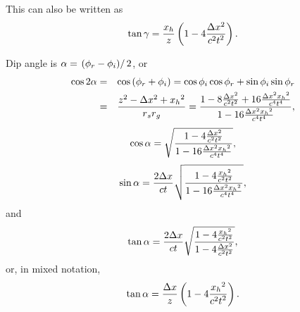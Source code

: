 This can also be written as
\begin{equation}\tan  \gamma =\frac{\text{\textit{$ x_h$}}}{\text{\textit{$z$}}}\left(1-4\frac{\Delta \text{\textit{$x$}}^2\text{\textit{$ $}}}{\text{\textit{$c$}}^2\text{\textit{$
$}}\text{\textit{$t$}}^2}\right).\end{equation}

Dip angle is \(\alpha =\left.\left(\phi _r-\phi _i\right)\right/2\), or
\begin{eqnarray}\cos  2\alpha &=&\cos  \left(\phi _{\text{\textit{$r$}}}+\phi _{\text{\textit{$i$}}}\right)=\cos  \phi _{\text{\textit{$i$}}}\cos
\phi _{\text{\textit{$r$}}}+\sin  \phi _{\text{\textit{$i$}}} \sin  \phi _{\text{\textit{$r$}}}\nonumber\\
&=&\frac{\text{\textit{$z$}}^2\text{\textit{$ $}}-\Delta \text{\textit{$x$}}^2+\text{\textit{$x_h$}}{}^2}{\text{\textit{$r$}}_{\text{\textit{$s$}}}\text{\textit{$r$}}_{\text{\textit{$g$}}}}=\frac{1-8
\frac{\text{\textit{$ $}}\Delta \text{\textit{$x$}}^2}{\text{\textit{$c$}}^2\text{\textit{$ $}}\text{\textit{$t$}}^2}+16\frac{\Delta \text{\textit{$x$}}^2\text{\textit{$
$}}\text{\textit{$x_h$}}{}^2}{\text{\textit{$c$}}^4\text{\textit{$ $}}\text{\textit{$t$}}^4}}{1-16\frac{\Delta \text{\textit{$x$}}^2\text{\textit{$
$}}\text{\textit{$x_h$}}{}^2}{\text{\textit{$c$}}^4\text{\textit{$ $}}\text{\textit{$t$}}^4}},
\end{eqnarray}
\begin{equation}\cos  \alpha =\sqrt{\frac{1 -4 \frac{\text{\textit{$ $}}\Delta \text{\textit{$x$}}^2}{\text{\textit{$c$}}^2\text{\textit{$ $}}\text{\textit{$t$}}^2}}{1-16\frac{\Delta
\text{\textit{$x$}}^2\text{\textit{$ $}}\text{\textit{$x_h$}}{}^2}{\text{\textit{$c$}}^4\text{\textit{$ $}}\text{\textit{$t$}}^4}}},\end{equation}
\begin{equation}\sin  \alpha =\frac{2\text{\textit{$ $}}\Delta \text{\textit{$x$}}}{\text{\textit{$c t$}}}\sqrt{\frac{1-4\frac{\text{\textit{$x_h$}}{}^2\text{\textit{$
$}}}{\text{\textit{$c$}}^2\text{\textit{$ $}}\text{\textit{$t$}}^2} }{1-16\frac{\Delta \text{\textit{$x$}}^2\text{\textit{$ $}}\text{\textit{$x_h$}}{}^2}{\text{\textit{$c$}}^4\text{\textit{$
$}}\text{\textit{$t$}}^4}}},\end{equation}
and
\begin{equation}\tan  \alpha =\frac{2\text{\textit{$ $}}\Delta \text{\textit{$x$}}}{\text{\textit{$c t$}}}\sqrt{\frac{1-4\frac{\text{\textit{$x_h$}}{}^2\text{\textit{$
$}}}{\text{\textit{$c$}}^2\text{\textit{$ $}}\text{\textit{$t$}}^2} }{1 -4 \frac{\text{\textit{$ $}}\Delta \text{\textit{$x$}}^2}{\text{\textit{$c$}}^2\text{\textit{$
$}}\text{\textit{$t$}}^2}}},\end{equation}
or, in mixed notation,
\begin{equation}\tan  \alpha =\frac{\text{\textit{$ $}}\Delta \text{\textit{$x$}}}{\text{\textit{$z$}}}\left(1-4\frac{\text{\textit{$x_h$}}{}^2\text{\textit{$
$}}}{\text{\textit{$c$}}^2\text{\textit{$ $}}\text{\textit{$t$}}^2}\right) .\end{equation}

